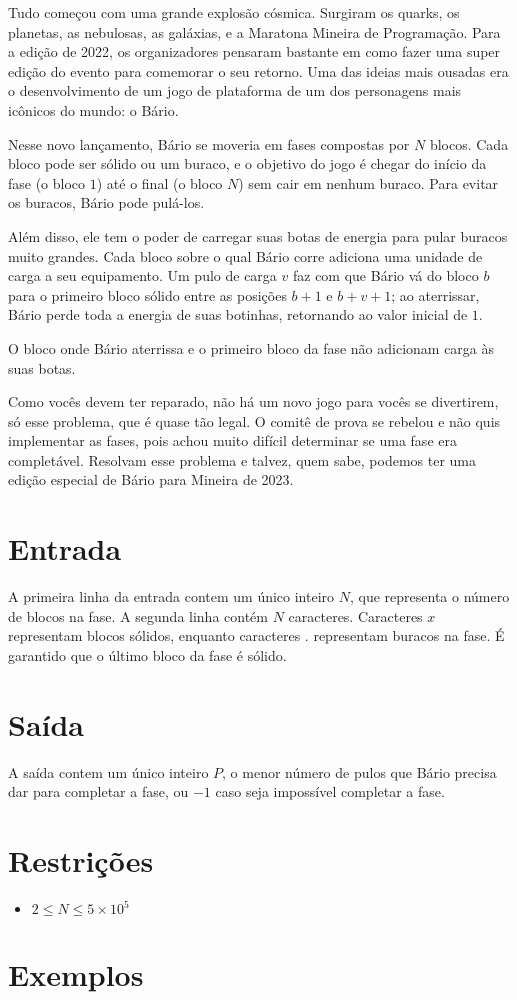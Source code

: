 Tudo começou com uma grande explosão cósmica. Surgiram os quarks, os planetas, as nebulosas, as galáxias, e a Maratona Mineira de Programação.
Para a edição de 2022, os organizadores pensaram bastante em como fazer uma super edição do evento para comemorar o seu retorno. Uma das ideias mais
ousadas era o desenvolvimento de um jogo de plataforma de um dos personagens mais icônicos do mundo: o Bário.

Nesse novo lançamento, Bário se moveria em fases compostas por $N$ blocos. Cada bloco pode ser sólido ou um buraco, e o objetivo do jogo é chegar do início da fase (o bloco $1$) até o final (o bloco $N$) sem cair em nenhum buraco.
Para evitar os buracos, Bário pode pulá-los.

Além disso, ele tem o poder de carregar suas botas de energia para pular buracos muito grandes. Cada bloco sobre o qual Bário corre adiciona uma unidade de carga a seu equipamento. Um pulo de carga $v$ faz com que Bário vá do bloco $b$ para o primeiro bloco sólido entre as posições $b+1$ e $b+v+1$;
ao aterrissar, Bário perde toda a energia de suas botinhas, retornando ao valor inicial de $1$.

O bloco onde Bário aterrissa e o primeiro bloco da fase não adicionam carga às suas botas.

Como vocês devem ter reparado, não há um novo jogo para vocês se divertirem, só esse problema, que é quase tão legal. O comitê de prova se rebelou e não quis implementar as fases, pois achou muito difícil determinar se uma fase era completável.
Resolvam esse problema e talvez, quem sabe, podemos ter uma edição especial de Bário para Mineira de 2023.

\section*{Entrada}

A primeira linha da entrada contem um único inteiro $N$, que representa o número de blocos na fase.
A segunda linha contém $N$ caracteres. Caracteres $x$ representam blocos sólidos, enquanto caracteres $.$ representam buracos na fase. É garantido que o último bloco da fase é sólido.

\section*{Saída}

A saída contem um único inteiro $P$, o menor número de pulos que Bário precisa dar para completar a fase, ou $-1$ caso seja impossível completar a fase.

\section*{Restrições}

\begin{itemize}
\item $2 \leq N \leq 5 \times 10^5$
\end{itemize}


\section*{Exemplos}

\exemplo
